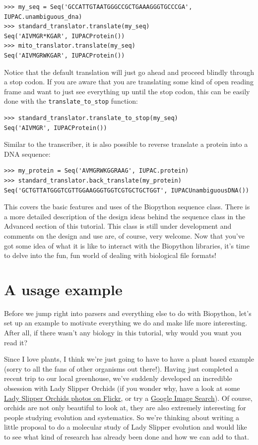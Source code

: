 \documentclass{report}
\begin{document}
\begin{verbatim}
>>> my_seq = Seq('GCCATTGTAATGGGCCGCTGAAAGGGTGCCCGA', IUPAC.unambiguous_dna)
>>> standard_translator.translate(my_seq)
Seq('AIVMGR*KGAR', IUPACProtein())
>>> mito_translator.translate(my_seq)
Seq('AIVMGRWKGAR', IUPACProtein())
\end{verbatim}

Notice that the default translation will just go ahead and proceed blindly through a stop codon. If you are aware that you are translating some kind of open reading frame and want to just see everything up until the stop codon, this can be easily done with the \verb|translate_to_stop| function:

\begin{verbatim}
>>> standard_translator.translate_to_stop(my_seq)
Seq('AIVMGR', IUPACProtein())
\end{verbatim}

Similar to the transcriber, it is also possible to reverse translate a protein into a DNA sequence:

\begin{verbatim}
>>> my_protein = Seq('AVMGRWKGGRAAG', IUPAC.protein)
>>> standard_translator.back_translate(my_protein)
Seq('GCTGTTATGGGTCGTTGGAAGGGTGGTCGTGCTGCTGGT', IUPACUnambiguousDNA())
\end{verbatim}

This covers the basic features and uses of the Biopython sequence class. There is a more detailed description of the design ideas behind the sequence class in the Advanced section of this tutorial. This class is still under development and comments on the design and use are, of course, very welcome. Now that you've got some idea of what it is like to interact with the Biopython libraries, it's time to delve into the fun, fun world of dealing with biological file formats!

\section{A usage example}
\label{sec:orchids}

Before we jump right into parsers and everything else to do with Biopython, let's set up an example to motivate everything we do and make life more interesting. After all, if there wasn't any biology in this tutorial, why would you want you read it?

Since I love plants, I think we're just going to have to have a plant based example (sorry to all the fans of other organisms out there!).  Having just completed a recent trip to our local greenhouse, we've suddenly developed an incredible obsession with Lady Slipper Orchids (if you wonder why, have a look at some \href{http://www.flickr.com/search/?q=lady+slipper+orchid&s=int&z=t}{Lady Slipper Orchids photos on Flickr}, or try a \href{http://images.google.com/images?q=lady%20slipper%20orchid}{Google Image Search}).  Of course, orchids are not only beautiful to look at, they are also extremely interesting for people studying evolution and systematics. So we're thinking about writing a little proposal to do a molecular study of Lady Slipper evolution and would like to see what kind of research has already been done and how we can add to that.
\end{document}
